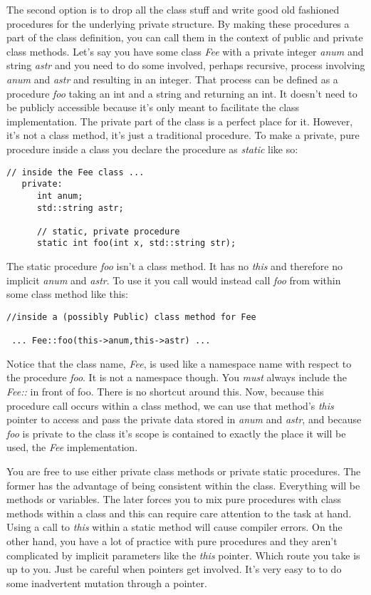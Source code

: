 \documentclass[10pt]{article}
\begin{document}
The second option is to drop all the class stuff and write good old fashioned procedures for the underlying private structure. By making these procedures a part of the class definition, you can call them in the context of public and private class methods. Let's say you have some class \textit{Fee} with a private integer \textit{anum} and string \textit{astr} and you need to do some involved, perhaps recursive, process involving \textit{anum} and \textit{astr} and resulting in an integer. That process can be defined as a procedure \textit{foo} taking an int and a string and returning an int. It doesn't need to be publicly accessible because it's only meant to facilitate the class implementation. The private part of the class is a perfect place for it. However, it's not a class method, it's just a traditional procedure. To make a private, pure procedure inside a class you declare the procedure as \textit{static} like so:
\begin{verbatim}
// inside the Fee class ...  
   private: 
      int anum;
      std::string astr;
      
      // static, private procedure
      static int foo(int x, std::string str);
\end{verbatim}
The static procedure \textit{foo} isn't a class method. It has no \textit{this} and therefore no implicit \textit{anum} and \textit{astr}.  To use it you call would instead call \textit{foo} from within some class method like this:
\begin{verbatim}
//inside a (possibly Public) class method for Fee

 ... Fee::foo(this->anum,this->astr) ...
\end{verbatim}
Notice that the class name, \textit{Fee}, is used like a namespace name with respect to the procedure \textit{foo}.  It is not a namespace though. You \textit{must} always include the \textit{Fee::} in front of foo. There is no shortcut around this. Now, because this procedure call occurs within a class method, we can use that method's \textit{this} pointer to access and pass the private data stored in \textit{anum} and \textit{astr}, and because \textit{foo} is private to the class it's scope is contained to exactly the place it will be used, the \textit{Fee} implementation.

You are free to use either private class methods or private static procedures. The former has the advantage of being consistent within the class. Everything will be methods or variables. The later forces you to mix pure procedures with class methods within a class and this can require care attention to the task at hand. Using a call to \textit{this} within a static method will cause compiler errors. On the other hand, you have a lot of practice with pure procedures and they aren't complicated by implicit parameters like the \textit{this} pointer. Which route you take is up to you. Just be careful when pointers get involved. It's very easy to to do some inadvertent mutation through a pointer.
\end{document}
